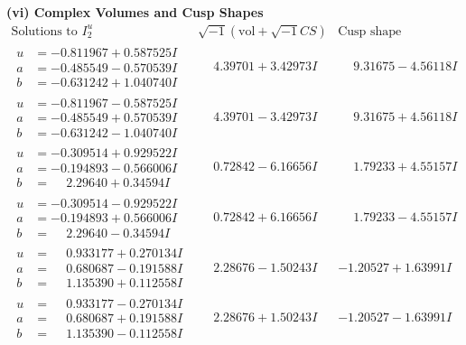 \documentclass[1p]{elsarticle_modified}
\theoremstyle{definition}
\newcommand{\I}{\sqrt{-1}}
\begin{document}
\newpage\flushleft \textbf{(vi) Complex Volumes and Cusp Shapes}
$$\begin{array}{c|c|c}  
\text{Solutions to }I^u_{2}& \I (\text{vol} + \sqrt{-1}CS) & \text{Cusp shape}\\
 \hline 
\begin{aligned}
u &= -0.811967 + 0.587525 I \\
a &= -0.485549 - 0.570539 I \\
b &= -0.631242 + 1.040740 I\end{aligned}
 & \phantom{-}4.39701 + 3.42973 I & \phantom{-}9.31675 - 4.56118 I \\ \hline\begin{aligned}
u &= -0.811967 - 0.587525 I \\
a &= -0.485549 + 0.570539 I \\
b &= -0.631242 - 1.040740 I\end{aligned}
 & \phantom{-}4.39701 - 3.42973 I & \phantom{-}9.31675 + 4.56118 I \\ \hline\begin{aligned}
u &= -0.309514 + 0.929522 I \\
a &= -0.194893 - 0.566006 I \\
b &= \phantom{-}2.29640 + 0.34594 I\end{aligned}
 & \phantom{-}0.72842 - 6.16656 I & \phantom{-}1.79233 + 4.55157 I \\ \hline\begin{aligned}
u &= -0.309514 - 0.929522 I \\
a &= -0.194893 + 0.566006 I \\
b &= \phantom{-}2.29640 - 0.34594 I\end{aligned}
 & \phantom{-}0.72842 + 6.16656 I & \phantom{-}1.79233 - 4.55157 I \\ \hline\begin{aligned}
u &= \phantom{-}0.933177 + 0.270134 I \\
a &= \phantom{-}0.680687 - 0.191588 I \\
b &= \phantom{-}1.135390 + 0.112558 I\end{aligned}
 & \phantom{-}2.28676 - 1.50243 I & -1.20527 + 1.63991 I \\ \hline\begin{aligned}
u &= \phantom{-}0.933177 - 0.270134 I \\
a &= \phantom{-}0.680687 + 0.191588 I \\
b &= \phantom{-}1.135390 - 0.112558 I\end{aligned}
 & \phantom{-}2.28676 + 1.50243 I & -1.20527 - 1.63991 I \\ \hline\begin{aligned}

\end{aligned}
\end{array}$$
\end{document}
